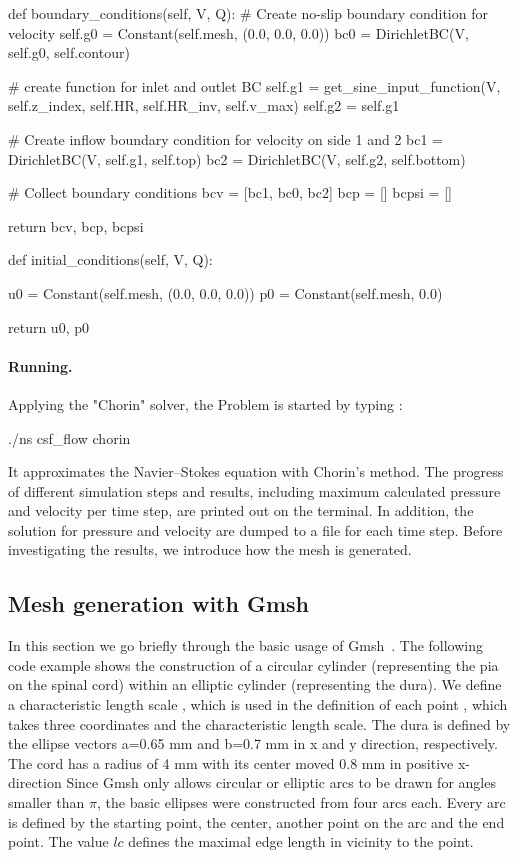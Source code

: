 \begin{python}
def boundary_conditions(self, V, Q):
	# Create no-slip boundary condition for velocity
	self.g0 = Constant(self.mesh, (0.0, 0.0, 0.0))
	bc0 = DirichletBC(V, self.g0, self.contour)

	# create function for inlet and outlet BC
	self.g1 = get_sine_input_function(V, self.z_index, self.HR, self.HR_inv, self.v_max)
	self.g2 = self.g1

	# Create inflow boundary condition for velocity on side 1 and 2
	bc1 = DirichletBC(V, self.g1, self.top)
	bc2 = DirichletBC(V, self.g2, self.bottom)

	# Collect boundary conditions
	bcv = [bc1, bc0, bc2]
	bcp = []
	bcpsi = []

	return bcv, bcp, bcpsi

def initial_conditions(self, V, Q):

	u0 = Constant(self.mesh, (0.0, 0.0, 0.0))
	p0 = Constant(self.mesh, 0.0)

	return u0, p0
\end{python}

\paragraph{Running.}
Applying the "Chorin" solver, the Problem is started by typing :
\begin{bash}
./ns csf_flow chorin
\end{bash}

It approximates the Navier--Stokes equation with Chorin's method. The
progress of different simulation steps and results, including maximum
calculated pressure and velocity per time step, are printed out on the
terminal. In addition, the solution for pressure and velocity are
dumped to a file for each time step. Before investigating the results,
we introduce how the mesh is generated.

\subsection{Mesh generation with Gmsh}

In this section we go briefly through the basic usage of
Gmsh~\citep{GeuzaineRemacle}.  The following code example shows the
construction of a circular cylinder (representing the pia on the
spinal cord) within an elliptic cylinder (representing the dura).  We
define a characteristic length scale , which is used in the
definition of each point , which takes three coordinates
and the characteristic length scale.  The dura is defined by the
ellipse vectors a=0.65 mm and b=0.7 mm in x and y direction,
respectively. The cord has a radius of 4 mm with its center moved 0.8
mm in positive x-direction Since Gmsh only allows circular or elliptic
arcs to be drawn for angles smaller than $\pi$, the basic ellipses
were constructed from four arcs each. Every arc is defined by the
starting point, the center, another point on the arc and the end
point. The value $lc$ defines the maximal edge length in vicinity to
the point.

